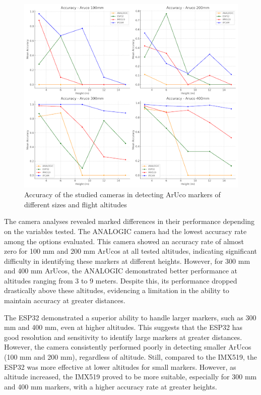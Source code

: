 \documentclass[letterpaper]{article}
\begin{document}
\begin{figure}[H]
\centering
\includegraphics[width=1\columnwidth]{images/cameras_accuracy.png}
\caption{Accuracy of the studied cameras in detecting ArUco markers of different sizes and flight altitudes}
\label{figure:cameras_accuracy}
\end{figure}

The camera analyses revealed marked differences in their performance depending on the variables tested. The ANALOGIC camera had the lowest accuracy rate among the options evaluated. This camera showed an accuracy rate of almost zero for 100 mm and 200 mm ArUcos at all tested altitudes, indicating significant difficulty in identifying these markers at different heights. However, for 300 mm and 400 mm ArUcos, the ANALOGIC demonstrated better performance at altitudes ranging from 3 to 9 meters. Despite this, its performance dropped drastically above these altitudes, evidencing a limitation in the ability to maintain accuracy at greater distances.

The ESP32 demonstrated a superior ability to handle larger markers, such as 300 mm and 400 mm, even at higher altitudes. This suggests that the ESP32 has good resolution and sensitivity to identify large markers at greater distances. However, the camera consistently performed poorly in detecting smaller ArUcos (100 mm and 200 mm), regardless of altitude. Still, compared to the IMX519, the ESP32 was more effective at lower altitudes for small markers. However, as altitude increased, the IMX519 proved to be more suitable, especially for 300 mm and 400 mm markers, with a higher accuracy rate at greater heights.
\end{document}
